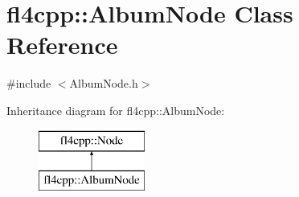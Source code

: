 \hypertarget{classfl4cpp_1_1_album_node}{}\section{fl4cpp\+:\+:Album\+Node Class Reference}
\label{classfl4cpp_1_1_album_node}


{\ttfamily \#include $<$Album\+Node.\+h$>$}

Inheritance diagram for fl4cpp\+:\+:Album\+Node\+:\begin{figure}[H]
\begin{center}
\leavevmode
\includegraphics[height=2.000000cm]{classfl4cpp_1_1_album_node}
\end{center}
\end{figure}
